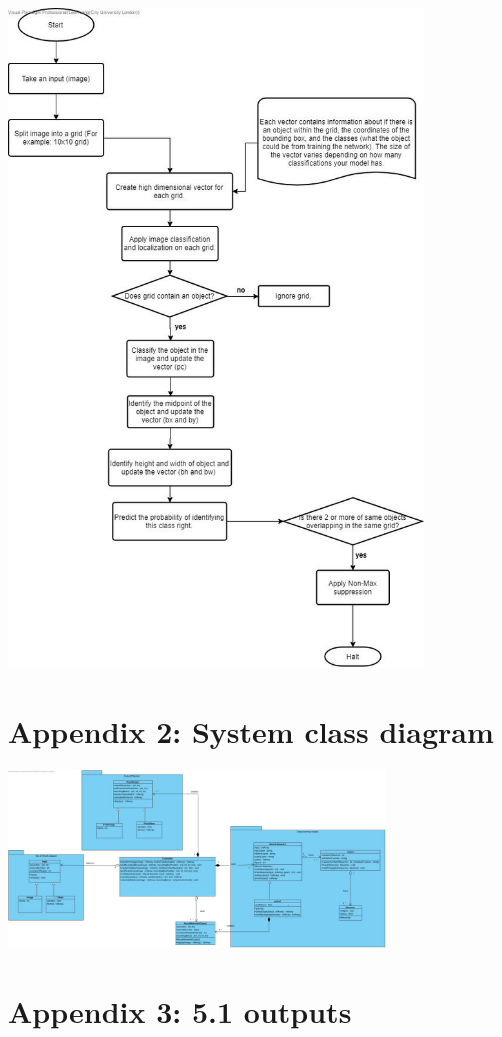 \documentclass[12pt]{report}
\begin{document}
\includegraphics[width=110mm]{./images/YOLO.jpg}

\section*{Appendix 2: System class diagram}

\includegraphics[angle = 90,width=100mm]{./images/SD Class diagram.jpg}

\section*{Appendix 3: 5.1 outputs}
\end{document}
